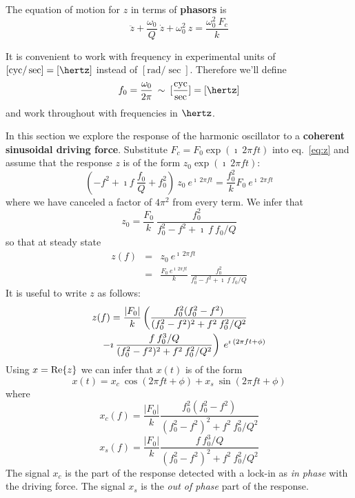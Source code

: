 The equation of motion for $z$ in terms of {\bf phasors} is
\begin{equation}
\ddot{z} + \frac{\omega_0}{Q} \: \dot{z} + \omega_0^2 \: z = \frac{\omega_0^2 \: F_c}{k}
\label{eq:z}
\end{equation}


\label{sect:steady-state-response-I}

It is convenient to work with frequency in experimental units of
$[\mbox{cyc}/\sec] = [\hertz]$ instead of $[\mbox{rad}/\sec]$.
Therefore we'll define
\begin{equation}
f_0 = \frac{\omega_0}{2 \pi} \: \sim \: [\frac{\mbox{cyc}}{\sec}] = [\hertz]
\end{equation}
and work throughout with frequencies in $\hertz$.

In this section we explore the response of the harmonic oscillator to
a {\bf coherent sinusoidal driving force}.  Substitute $F_c = F_0
\exp{(\imath \: 2 \pi f t)}$ into eq.~\ref{eq:z} 
and assume that the response $z$ is of the form $z_0 \exp{(\imath \: 2 \pi f t)}$:
\begin{equation}
(-f^2 + \imath f \: \frac{f_0}{Q} + f_0^2 ) \: z_0 \: e^{\imath \: 2 \pi f t} = \frac{f_0^2}{k} F_0 \: e^{\imath \: 2 \pi f t}
\end{equation}
where we have canceled a factor of $4 \pi^2$ from every term.  We infer that
\begin{equation}
z_0 = \frac{F_0}{k} \: \frac{f_0^2}{f_0^2 - f^2 + \imath \: f \: f_0 / Q}
\end{equation}
so that at steady state
\begin{eqnarray}
z(f) & = & z_0 \: e^{\imath \: 2 \pi f t} \\
     & = & \frac{F_0 \: e^{\imath \: 2 \pi f t}}{k} \: \frac{f_0^2}{f_0^2 - f^2 + \imath \: f \: f_0 / Q}
\end{eqnarray}
It is useful to write $z$ as follows:
\begin{eqnarray}
\lefteqn{z(f) = \frac{| F_0 |}{k} \left( \frac{f_0^2 (f_0^2 - f^2)}{(f_0^2 - f^2)^2 + f^2 \: f_0^2 / Q^2} \right. \nonumber}\\
&  & \left. - \imath \: \frac{f \: f_0^3 / Q}{(f_0^2 - f^2)^2 + f^2 \: f_0^2 / Q^2} \right) \: e^{\imath \: ( 2 \pi f t + \phi)}
\end{eqnarray}
Using $x = \mbox{Re}\{z\}$ we can infer that $x(t)$ is of the form
\begin{equation}
x(t) = x_c \: \cos{(2 \pi f t + \phi)} + x_s \: \sin{(2 \pi f t + \phi)}
\end{equation}
where
\begin{equation}
x_c(f) = \frac{| F_0 |}{k} \frac{f_0^2 ( f_0^2 - f^2)}{(f_0^2 - f^2)^2 + f^2 \: f_0^2 / Q^2} 
\end{equation}
\begin{equation}
x_s(f) = \frac{| F_0 |}{k} \frac{f \: f_0^3 / Q}{(f_0^2 - f^2)^2 + f^2 \: f_0^2 / Q^2}
\end{equation}
The signal $x_c$ is the part of the response detected with a lock-in
as \emph{in phase} with the driving force.  The signal $x_s$ is the
\emph{out of phase} part of the response.


